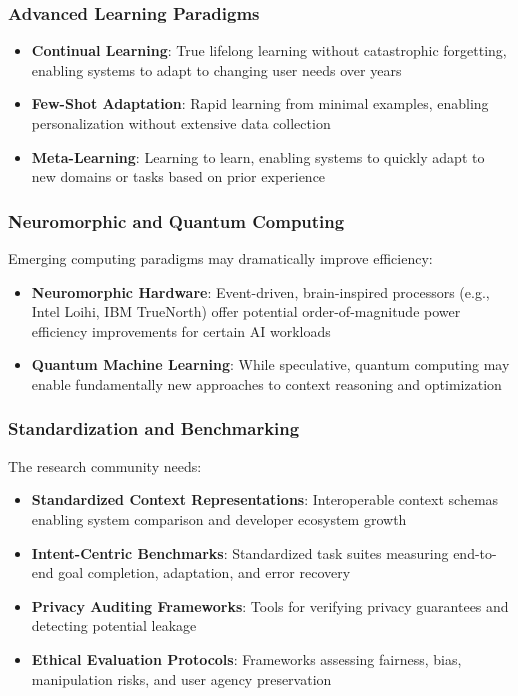 \documentclass[conference]{IEEEtran}
\begin{document}
\subsubsection{Advanced Learning Paradigms}

\begin{itemize}
\item \textbf{Continual Learning}: True lifelong learning without catastrophic forgetting, enabling systems to adapt to changing user needs over years
\item \textbf{Few-Shot Adaptation}: Rapid learning from minimal examples, enabling personalization without extensive data collection
\item \textbf{Meta-Learning}: Learning to learn, enabling systems to quickly adapt to new domains or tasks based on prior experience
\end{itemize}

\subsubsection{Neuromorphic and Quantum Computing}

Emerging computing paradigms may dramatically improve efficiency:
\begin{itemize}
\item \textbf{Neuromorphic Hardware}: Event-driven, brain-inspired processors (e.g., Intel Loihi, IBM TrueNorth) offer potential order-of-magnitude power efficiency improvements for certain AI workloads
\item \textbf{Quantum Machine Learning}: While speculative, quantum computing may enable fundamentally new approaches to context reasoning and optimization
\end{itemize}

\subsubsection{Standardization and Benchmarking}

The research community needs:
\begin{itemize}
\item \textbf{Standardized Context Representations}: Interoperable context schemas enabling system comparison and developer ecosystem growth
\item \textbf{Intent-Centric Benchmarks}: Standardized task suites measuring end-to-end goal completion, adaptation, and error recovery
\item \textbf{Privacy Auditing Frameworks}: Tools for verifying privacy guarantees and detecting potential leakage
\item \textbf{Ethical Evaluation Protocols}: Frameworks assessing fairness, bias, manipulation risks, and user agency preservation
\end{itemize}
\end{document}
